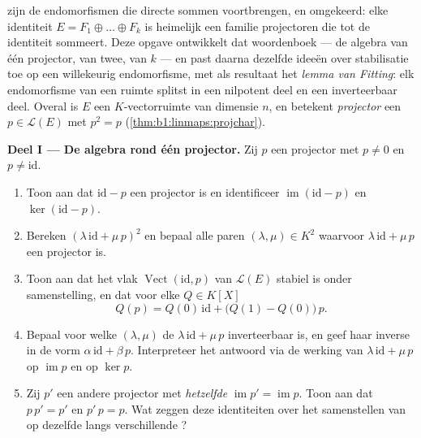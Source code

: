 \begin{problem}\label{pb:b1:linmaps:1}
 zijn de endomorfismen die directe sommen voortbrengen,
en omgekeerd: elke identiteit $E = F_1 \oplus \dots \oplus F_k$ is
heimelijk een familie projectoren die tot de identiteit sommeert.
Deze opgave ontwikkelt dat woordenboek --- de algebra van één
projector, van twee, van $k$ --- en past daarna dezelfde ideeën
over stabilisatie toe op een willekeurig endomorfisme, met als
resultaat het \emph{lemma van Fitting}: elk endomorfisme van een
 ruimte splitst in een nilpotent deel en een
inverteerbaar deel. Overal is $E$ een $K$-vectorruimte van
dimensie $n$, en betekent \emph{projector} een $p \in
\mathcal{L}(E)$ met $p^2 = p$ (\cref{thm:b1:linmaps:projchar}).

\medskip
\noindent\textbf{Deel I --- De algebra rond één projector.} Zij
$p$ een projector met $p \neq 0$ en $p \neq \mathrm{id}$.
\begin{enumerate}
  \item Toon aan dat $\mathrm{id} - p$ een projector is en
        identificeer $\operatorname{im}(\mathrm{id} - p)$ en
        $\ker(\mathrm{id} - p)$.
  \item Bereken $(\lambda\,\mathrm{id} + \mu\,p)^2$ en bepaal alle
        paren $(\lambda, \mu) \in K^2$ waarvoor
        $\lambda\,\mathrm{id} + \mu\,p$ een projector is.
  \item Toon aan dat het vlak $\operatorname{Vect}(\mathrm{id},
        p)$ van $\mathcal{L}(E)$ stabiel is onder samenstelling, en
        dat voor elke  $Q \in K[X]$
        \[
        Q(p) = Q(0)\,\mathrm{id} + \bigl(Q(1) -
        Q(0)\bigr)\,p .
        \]
  \item Bepaal voor welke $(\lambda, \mu)$ de 
        $\lambda\,\mathrm{id} + \mu\,p$ inverteerbaar is, en geef
        haar inverse in de vorm $\alpha\,\mathrm{id} + \beta\,p$.
        Interpreteer het antwoord via de werking van
        $\lambda\,\mathrm{id} + \mu\,p$ op $\operatorname{im} p$ en
        op $\ker p$.
  \item Zij $p'$ een andere projector met \emph{hetzelfde }
        $\operatorname{im} p' = \operatorname{im} p$. Toon aan dat
        $p\,p' = p'$ en $p'\,p = p$. Wat zeggen deze identiteiten
        over het samenstellen van  op dezelfde 
        langs verschillende ?
\end{enumerate}


\end{problem}
